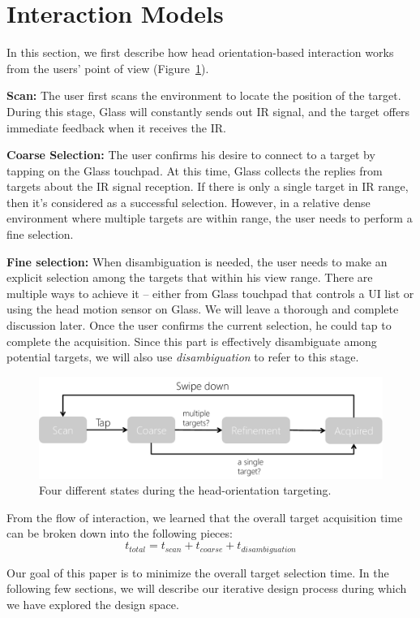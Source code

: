
\section{Interaction Models}

In this section, we first describe how head orientation-based interaction works from the users' point of view (Figure~\ref{fig:interaction}).

{\bf Scan:} The user first scans the environment to locate the position of the target. During this stage, Glass will constantly sends out IR signal, and the target offers immediate feedback when it receives the IR. 

{\bf Coarse Selection:} The user confirms his desire to connect to a target by tapping on the Glass touchpad. At this time, Glass collects the replies from targets about the IR signal reception. If there is only a single target in IR range, then it's considered as a successful selection. However, in a relative dense environment where multiple targets are within range, the user needs to perform a fine selection.

{\bf Fine selection:} When disambiguation is needed, the user needs to make an explicit selection among the targets that within his view range. There are multiple ways to achieve it -- either from Glass touchpad that controls a UI list or using the head motion sensor on Glass. We will leave a thorough and complete discussion later. Once the user confirms the current selection, he could tap to complete the acquisition. Since this part is effectively disambiguate among potential targets, we will also use {\em disambiguation} to refer to this stage.

\begin{figure}[t!]
\centering
\includegraphics[width=\columnwidth]{figures/interactionModel.pdf}
\caption{Four different states during the head-orientation targeting.}
\label{fig:interaction}
\end{figure}

From the flow of interaction, we learned that the overall target acquisition time can be broken down into the following pieces:
\begin{equation}
t_{total}=t_{scan}+t_{coarse}+t_{disambiguation}
\end{equation}

Our goal of this paper is to minimize the overall target selection time. In the following few sections, we will describe our iterative design process during which we have explored the design space. 

